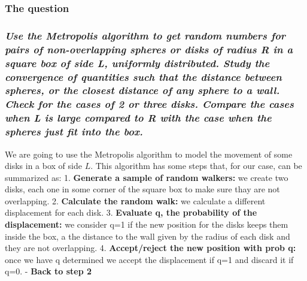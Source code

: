 \documentclass[11pt]{article}
\begin{document}
\hypertarget{the-question-1}{%
\subsubsection{\texorpdfstring{\textbf{The
question}}{The question}}\label{the-question-1}}

\hypertarget{use-the-metropolis-algorithm-to-get-random-numbers-for-pairs-of-non-overlapping-spheres-or-disks-of-radius-r-in-a-square-box-of-side-l-uniformly-distributed.-study-the-convergence-of-quantities-such-that-the-distance-between-spheres-or-the-closest-distance-of-any-sphere-to-a-wall.-check-for-the-cases-of-2-or-three-disks.-compare-the-cases-when-l-is-large-compared-to-r-with-the-case-when-the-spheres-just-fit-into-the-box.}{%
\subsubsection{\texorpdfstring{\emph{Use the Metropolis algorithm to get
random numbers for pairs of non-overlapping spheres or disks of radius R
in a square box of side L, uniformly distributed. Study the convergence
of quantities such that the distance between spheres, or the closest
distance of any sphere to a wall. Check for the cases of 2 or three
disks. Compare the cases when L is large compared to R with the case
when the spheres just fit into the
box.}}{Use the Metropolis algorithm to get random numbers for pairs of non-overlapping spheres or disks of radius R in a square box of side L, uniformly distributed. Study the convergence of quantities such that the distance between spheres, or the closest distance of any sphere to a wall. Check for the cases of 2 or three disks. Compare the cases when L is large compared to R with the case when the spheres just fit into the box.}}\label{use-the-metropolis-algorithm-to-get-random-numbers-for-pairs-of-non-overlapping-spheres-or-disks-of-radius-r-in-a-square-box-of-side-l-uniformly-distributed.-study-the-convergence-of-quantities-such-that-the-distance-between-spheres-or-the-closest-distance-of-any-sphere-to-a-wall.-check-for-the-cases-of-2-or-three-disks.-compare-the-cases-when-l-is-large-compared-to-r-with-the-case-when-the-spheres-just-fit-into-the-box.}}

We are going to use the Metropolis algorithm to model the movement of
some disks in a box of side \(L\). This algorithm has some steps that,
for our case, can be summarized as: 1. \textbf{Generate a sample of
random walkers:} we create two disks, each one in some corner of the
square box to make sure thay are not overlapping. 2. \textbf{Calculate
the random walk:} we calculate a different displacement for each disk.
3. \textbf{Evaluate q, the probability of the displacement:} we consider
q=1 if the new position for the disks keeps them inside the box, a the
distance to the wall given by the radius of each disk and they are not
overlapping. 4. \textbf{Accept/reject the new position with prob q:}
once we have q determined we accept the displacement if q=1 and discard
it if q=0. - \textbf{Back to step 2}
\end{document}

